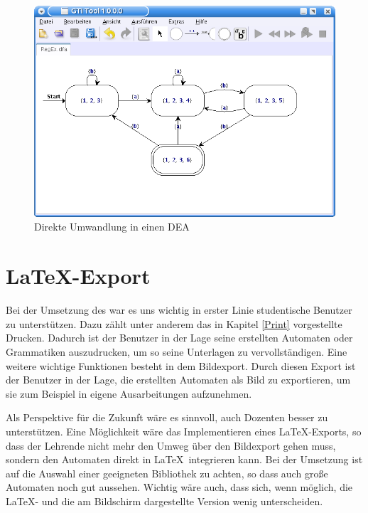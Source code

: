 \begin{figure}[h!]
\begin{center}
\includegraphics[width=12cm]{../images/regex_dfa.png}
\caption{Direkte Umwandlung in einen DEA}
\label{FigureRegExDFA}
\end{center}
\end{figure}


\section{\LaTeX-Export}

Bei der Umsetzung des \gtitools war es uns wichtig in erster Linie studentische
Benutzer zu unterstützen. Dazu zählt unter anderem das in Kapitel \ref{Print}
vorgestellte Drucken. Dadurch ist der Benutzer in der Lage seine erstellten
Automaten oder Grammatiken auszudrucken, um so seine Unterlagen zu
vervollständigen. Eine weitere wichtige Funktionen besteht in dem Bildexport.
Durch diesen Export ist der Benutzer in der Lage, die erstellten Automaten als
Bild zu exportieren, um sie zum Beispiel in eigene Ausarbeitungen
aufzunehmen.\vspace{10pt}

Als Perspektive für die Zukunft wäre es sinnvoll, auch Dozenten besser zu
unterstützen. Eine Möglichkeit wäre das Implementieren eines \LaTeX-Exports, so
dass der Lehrende nicht mehr den Umweg über den Bildexport gehen muss, sondern
den Automaten direkt in \LaTeX\ integrieren kann. Bei der Umsetzung ist auf die
Auswahl einer geeigneten Bibliothek zu achten, so dass auch große Automaten
noch gut aussehen. Wichtig wäre auch, dass sich, wenn möglich, die \LaTeX-
und die am Bildschirm dargestellte Version wenig unterscheiden.



